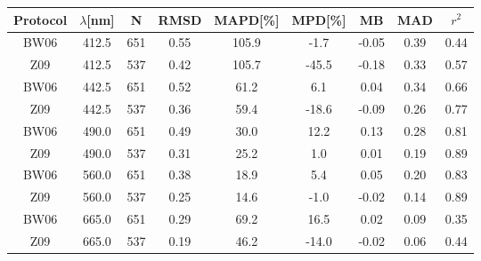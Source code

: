 \documentclass[preview]{standalone}
\begin{document}
\small

\begin{table}
\begin{tabular}{ccccccccc}

\hline
Protocol & $\lambda$[nm] & N   & RMSD & MAPD[\%] & MPD[\%] & MB    & MAD  & $r^2$ \\\hline
 
    BW06 &      412.5 &  651 &  0.55 & 105.9  &  -1.7 & -0.05 & 0.39 &   0.44 \\
     Z09 &      412.5 &  537 &  0.42 & 105.7  & -45.5 & -0.18 & 0.33 &   0.57 \\\hline
     
    BW06 &      442.5 &  651 &  0.52 &  61.2  &   6.1 &  0.04 & 0.34 &   0.66 \\
     Z09 &      442.5 &  537 &  0.36 &  59.4  & -18.6 & -0.09 & 0.26 &   0.77 \\\hline
     
    BW06 &      490.0 &  651 &  0.49 &  30.0  &  12.2 &  0.13 & 0.28 &   0.81 \\
     Z09 &      490.0 &  537 &  0.31 &  25.2  &   1.0 &  0.01 & 0.19 &   0.89 \\\hline
     
    BW06 &      560.0 &  651 &  0.38 &  18.9  &   5.4 &  0.05 & 0.20 &   0.83 \\
     Z09 &      560.0 &  537 &  0.25 &  14.6  &  -1.0 & -0.02 & 0.14 &   0.89 \\\hline
     
    BW06 &      665.0 &  651 &  0.29 &  69.2  &  16.5 &  0.02 & 0.09 &   0.35 \\
     Z09 &      665.0 &  537 &  0.19 &  46.2  & -14.0 & -0.02 & 0.06 &   0.44 \\\hline
                                                                           

\end{tabular}
\end{table}
\end{document}
